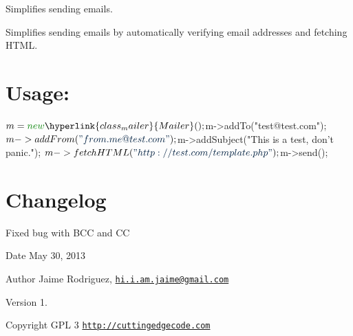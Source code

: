 Simplifies sending emails.

Simplifies sending emails by automatically verifying email addresses and fetching H\-T\-M\-L.\hypertarget{nav1_usage}{}\section{Usage\-:}\label{nav1_usage}

\begin{DoxyCode}
$m = \textcolor{keyword}{new} \hyperlink{class_mailer}{Mailer}();
$m->addTo(\textcolor{stringliteral}{"test@test.com"});
$m->addFrom(\textcolor{stringliteral}{"from.me@test.com"});
$m->addSubject(\textcolor{stringliteral}{"This is a test, don't panic."});
$m->fetchHTML(\textcolor{stringliteral}{"http://test.com/template.php"});
$m->send();
\end{DoxyCode}
\hypertarget{mailer1_changelog}{}\section{Changelog}\label{mailer1_changelog}

\begin{DoxyItemize}
\item Fixed bug with B\-C\-C and C\-C
\end{DoxyItemize}

\begin{DoxyDate}{Date}
May 30, 2013 
\end{DoxyDate}
\begin{DoxyAuthor}{Author}
Jaime Rodriguez, \href{mailto:hi.i.am.jaime@gmail.com}{\tt hi.\-i.\-am.\-jaime@gmail.\-com} 
\end{DoxyAuthor}
\begin{DoxyVersion}{Version}
1. 
\end{DoxyVersion}
\begin{DoxyCopyright}{Copyright}
G\-P\-L 3 \href{http://cuttingedgecode.com}{\tt http\-://cuttingedgecode.\-com} 
\end{DoxyCopyright}
